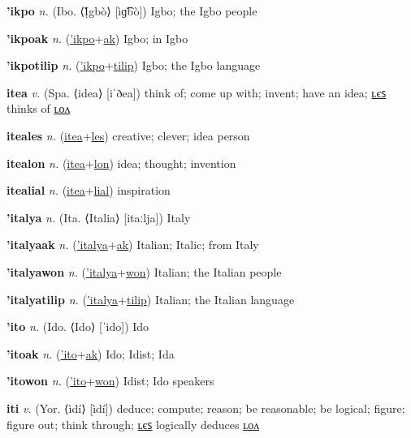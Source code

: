 \textbf{\hypertarget{'ikpo}{'ikpo}} \textit{n.} (Ibo. ⟨Ị̀gbò⟩ [ìɡ͡bò])
Igbo; the Igbo people

\textbf{\hypertarget{'ikpoak}{'ikpoak}} \textit{n.} (\hyperlink{'ikpo}{'ikpo}+\allowbreak \hyperlink{ak}{ak})
Igbo; in Igbo

\textbf{\hypertarget{'ikpotilip}{'ikpotilip}} \textit{n.} (\hyperlink{'ikpo}{'ikpo}+\allowbreak \hyperlink{tilip}{tilip})
Igbo; the Igbo language

\textbf{\hypertarget{itea}{itea}} \textit{v.} (Spa. ⟨idea⟩ [iˈðea])
think of; come up with; invent; have an idea; \hyperlink{iteales}{ʟєꜱ} thinks of \hyperlink{itealon}{ʟᴏᴧ}

\textbf{\hypertarget{iteales}{iteales}} \textit{n.} (\hyperlink{itea}{itea}+\allowbreak \hyperlink{les}{les})
creative; clever; idea person

\textbf{\hypertarget{itealon}{itealon}} \textit{n.} (\hyperlink{itea}{itea}+\allowbreak \hyperlink{lon}{lon})
idea; thought; invention

\textbf{\hypertarget{itealial}{itealial}} \textit{n.} (\hyperlink{itea}{itea}+\allowbreak \hyperlink{lial}{lial})
inspiration

\textbf{\hypertarget{'italya}{'italya}} \textit{n.} (Ita. ⟨Italia⟩ [itaːlja])
Italy

\textbf{\hypertarget{'italyaak}{'italyaak}} \textit{n.} (\hyperlink{'italya}{'italya}+\allowbreak \hyperlink{ak}{ak})
Italian; Italic; from Italy

\textbf{\hypertarget{'italyawon}{'italyawon}} \textit{n.} (\hyperlink{'italya}{'italya}+\allowbreak \hyperlink{won}{won})
Italian; the Italian people

\textbf{\hypertarget{'italyatilip}{'italyatilip}} \textit{n.} (\hyperlink{'italya}{'italya}+\allowbreak \hyperlink{tilip}{tilip})
Italian; the Italian language

\textbf{\hypertarget{'ito}{'ito}} \textit{n.} (Ido. ⟨Ido⟩ [ˈido])
Ido

\textbf{\hypertarget{'itoak}{'itoak}} \textit{n.} (\hyperlink{'ito}{'ito}+\allowbreak \hyperlink{ak}{ak})
Ido; Idist; Ida

\textbf{\hypertarget{'itowon}{'itowon}} \textit{n.} (\hyperlink{'ito}{'ito}+\allowbreak \hyperlink{won}{won})
Idist; Ido speakers

\textbf{\hypertarget{iti}{iti}} \textit{v.} (Yor. ⟨ìdí⟩ [ìdí])
deduce; compute; reason; be reasonable; be logical; figure; figure out; think through; \hyperlink{itiles}{ʟєꜱ} logically deduces \hyperlink{itilon}{ʟᴏᴧ}

